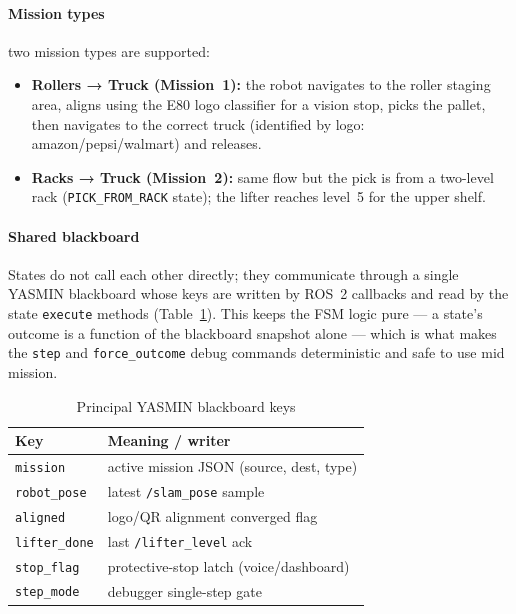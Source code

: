 \documentclass[conference]{IEEEtran}
\begin{document}
\paragraph{Mission types} two mission types are supported:
\begin{itemize}[noitemsep, leftmargin=*]
  \item \textbf{Rollers → Truck (Mission~1):} the robot navigates to
        the roller staging area, aligns using the E80 logo classifier
        for a vision stop, picks the pallet, then navigates to the
        correct truck (identified by logo: amazon/pepsi/walmart) and
        releases.
  \item \textbf{Racks → Truck (Mission~2):} same flow but the pick is
        from a two-level rack (\texttt{PICK\_FROM\_RACK} state); the
        lifter reaches level~5 for the upper shelf.
\end{itemize}

\paragraph{Shared blackboard}
States do not call each other directly; they communicate through a single
YASMIN blackboard whose keys are written by ROS~2 callbacks and read by
the state \texttt{execute} methods (Table~\ref{tab:blackboard}). This
keeps the FSM logic pure --- a state's outcome is a function of the
blackboard snapshot alone --- which is what makes the \texttt{step} and
\texttt{force\_outcome} debug commands deterministic and safe to use mid
mission.

\begin{table}[h]
\caption{Principal YASMIN blackboard keys}
\label{tab:blackboard}
\renewcommand{\arraystretch}{1.2}
\centering
\begin{tabular}{>{\raggedright}p{2.3cm}
                >{\raggedright\arraybackslash}p{5.1cm}}
\toprule
\textbf{Key} & \textbf{Meaning / writer} \\
\midrule
\texttt{mission}      & active mission JSON (source, dest, type) \\
\texttt{robot\_pose}  & latest \texttt{/slam\_pose} sample \\
\texttt{aligned}      & logo/QR alignment converged flag \\
\texttt{lifter\_done} & last \texttt{/lifter\_level} ack \\
\texttt{stop\_flag}   & protective-stop latch (voice/dashboard) \\
\texttt{step\_mode}   & debugger single-step gate \\
\bottomrule
\end{tabular}
\end{table}
\end{document}
